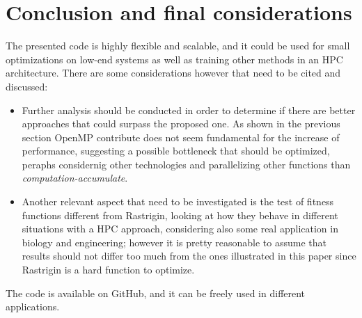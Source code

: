 \documentclass[10pt]{article}
\begin{document}
\section{Conclusion and final considerations}
The presented code is highly flexible and scalable, and it could be used for small optimizations on low-end systems as well as 
training other methods in an HPC architecture. There are some considerations however that need to be cited and discussed:

\begin{itemize}

\item Further analysis should be conducted in order to determine if there are better approaches that could surpass the proposed one.
As shown in the previous section OpenMP contribute does not seem fundamental for the increase of performance, suggesting a possible bottleneck
that should be optimized, peraphs considernig other technologies and parallelizing other functions than \textit{computation-accumulate}.

\item Another relevant aspect that need to be investigated is the test of fitness functions different from Rastrigin, looking at how they behave
in different situations with a HPC approach, considering also some real application in biology and engineering;
however it is pretty reasonable to assume that results should not differ too much from the ones illustrated in this paper since
Rastrigin is a hard function to optimize.
\end{itemize} The code is available on GitHub, and it can be freely 
used in different applications.\cite{GitHub}



\end{document}
